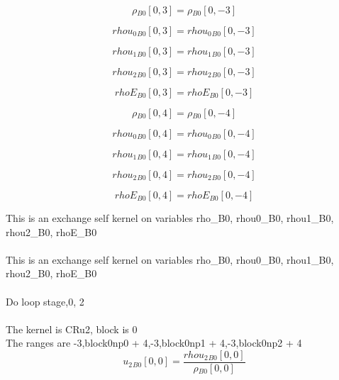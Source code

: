 \documentclass{article}
\begin{document}
\begin{dmath}{\rho{_{B0}}}[{0,3}] = {\rho{_{B0}}}[{0,-3}]\end{dmath}

\begin{dmath}{rhou_{0}{_{B0}}}[{0,3}] = {rhou_{0}{_{B0}}}[{0,-3}]\end{dmath}

\begin{dmath}{rhou_{1}{_{B0}}}[{0,3}] = {rhou_{1}{_{B0}}}[{0,-3}]\end{dmath}

\begin{dmath}{rhou_{2}{_{B0}}}[{0,3}] = {rhou_{2}{_{B0}}}[{0,-3}]\end{dmath}

\begin{dmath}{rhoE{_{B0}}}[{0,3}] = {rhoE{_{B0}}}[{0,-3}]\end{dmath}

\begin{dmath}{\rho{_{B0}}}[{0,4}] = {\rho{_{B0}}}[{0,-4}]\end{dmath}

\begin{dmath}{rhou_{0}{_{B0}}}[{0,4}] = {rhou_{0}{_{B0}}}[{0,-4}]\end{dmath}

\begin{dmath}{rhou_{1}{_{B0}}}[{0,4}] = {rhou_{1}{_{B0}}}[{0,-4}]\end{dmath}

\begin{dmath}{rhou_{2}{_{B0}}}[{0,4}] = {rhou_{2}{_{B0}}}[{0,-4}]\end{dmath}

\begin{dmath}{rhoE{_{B0}}}[{0,4}] = {rhoE{_{B0}}}[{0,-4}]\end{dmath}

\noindent This is an exchange self kernel on variables rho_B0, rhou0_B0, rhou1_B0, rhou2_B0, rhoE_B0\\\\\noindent This is an exchange self kernel on variables rho_B0, rhou0_B0, rhou1_B0, rhou2_B0, rhoE_B0\\\\\noindent Do loop stage,0, 2\\
\\\noindent The kernel is CRu2, block is 0\\\noindent The ranges are -3,block0np0 + 4,-3,block0np1 + 4,-3,block0np2 + 4\\\begin{dmath}{u_{2}{_{B0}}}[{0,0}] = \frac{{rhou_{2}{_{B0}}}[{0,0}]}{{\rho{_{B0}}}[{0,0}]}\end{dmath}
\end{document}
